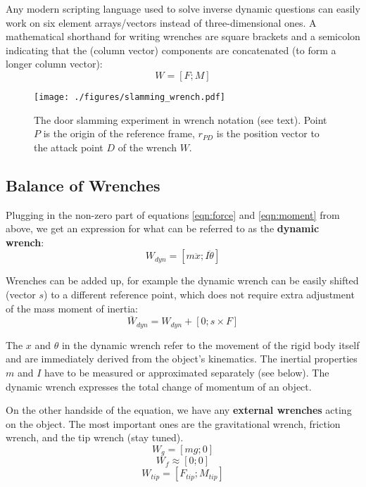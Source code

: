 Any modern scripting language used to solve inverse dynamic questions can easily work on six element arrays/vectors instead of three-dimensional ones.
A mathematical shorthand for writing wrenches are square brackets and a semicolon indicating that the (column vector) components are concatenated (to form a longer column vector):
\[W = \left[ F; M \right]\]

\begin{figure}[p]
\centering
\texttt{[image: ./figures/slamming\_wrench.pdf]}
\caption{\label{fig:slamming_wrench}The door slamming experiment in wrench notation (see text). Point \(P\) is the origin of the reference frame, \(r_{PD}\) is the position vector to the attack point \(D\) of the wrench \(W\).}
\end{figure}


\subsection{Balance of Wrenches}
\label{sec:org943ae71}
Plugging in the non-zero part of equations \eqref{eqn:force} and \eqref{eqn:moment} from above, we get an expression for what can be referred to as the \textbf{dynamic wrench}:
\begin{equation}\label{eqn:dynamic_wrench}
W_{dyn} = \left[ m\ddot x; I\ddot \theta \right]
\end{equation}

Wrenches can be added up, for example the dynamic wrench can be easily shifted (vector \(s\)) to a different reference point, which does not require extra adjustment of the mass moment of inertia:
\begin{equation}\label{eqn:shift_wrench}
\bar W_{dyn} = W_{dyn} + \left[ 0; s \times F \right]
\end{equation}


The \(x\) and \(\theta\) in the dynamic wrench refer to the movement of the rigid body itself and are immediately derived from the object's kinematics.
The inertial properties \(m\) and \(I\) have to be measured or approximated separately (see below).
The dynamic wrench expresses the total change of momentum of an object.


On the other handside of the equation, we have any \textbf{external wrenches} acting on the object.
The most important ones are the gravitational wrench, friction wrench, and the tip wrench (stay tuned).
\[W_{g} = \left[ mg; 0 \right]\]
\[W_{f} \approx \left[ 0; 0 \right]\]
\[W_{tip} = \left[ F_{tip}; M_{tip} \right]\]


